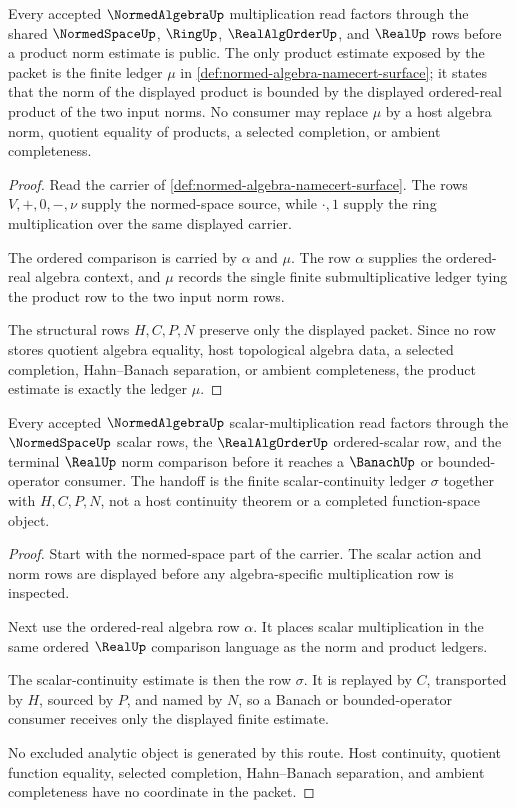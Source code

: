 \begin{theorem}
\label{thm:normed-algebra-submultiplicative-product}
Every accepted $\NormedAlgebraUp$ multiplication read factors through the shared $\NormedSpaceUp$, $\RingUp$, $\RealAlgOrderUp$, and $\RealUp$ rows before a product norm estimate is public. The only product estimate exposed by the packet is the finite ledger $\mu$ in \autoref{def:normed-algebra-namecert-surface}; it states that the norm of the displayed product is bounded by the displayed ordered-real product of the two input norms. No consumer may replace $\mu$ by a host algebra norm, quotient equality of products, a selected completion, or ambient completeness.
\end{theorem}
\begin{proof}
Read the carrier of \autoref{def:normed-algebra-namecert-surface}. The rows $V,+,0,-,\nu$ supply the normed-space source, while $\cdot,1$ supply the ring multiplication over the same displayed carrier.

The ordered comparison is carried by $\alpha$ and $\mu$. The row $\alpha$ supplies the ordered-real algebra context, and $\mu$ records the single finite submultiplicative ledger tying the product row to the two input norm rows.

The structural rows $H,C,P,N$ preserve only the displayed packet. Since no row stores quotient algebra equality, host topological algebra data, a selected completion, Hahn--Banach separation, or ambient completeness, the product estimate is exactly the ledger $\mu$.
\end{proof}

\begin{theorem}
\label{thm:normed-algebra-continuous-scalar-multiplication}
Every accepted $\NormedAlgebraUp$ scalar-multiplication read factors through the $\NormedSpaceUp$ scalar rows, the $\RealAlgOrderUp$ ordered-scalar row, and the terminal $\RealUp$ norm comparison before it reaches a $\BanachUp$ or bounded-operator consumer. The handoff is the finite scalar-continuity ledger $\sigma$ together with $H,C,P,N$, not a host continuity theorem or a completed function-space object.
\end{theorem}
\begin{proof}
Start with the normed-space part of the carrier. The scalar action and norm rows are displayed before any algebra-specific multiplication row is inspected.

Next use the ordered-real algebra row $\alpha$. It places scalar multiplication in the same ordered $\RealUp$ comparison language as the norm and product ledgers.

The scalar-continuity estimate is then the row $\sigma$. It is replayed by $C$, transported by $H$, sourced by $P$, and named by $N$, so a Banach or bounded-operator consumer receives only the displayed finite estimate.

No excluded analytic object is generated by this route. Host continuity, quotient function equality, selected completion, Hahn--Banach separation, and ambient completeness have no coordinate in the packet.
\end{proof}

